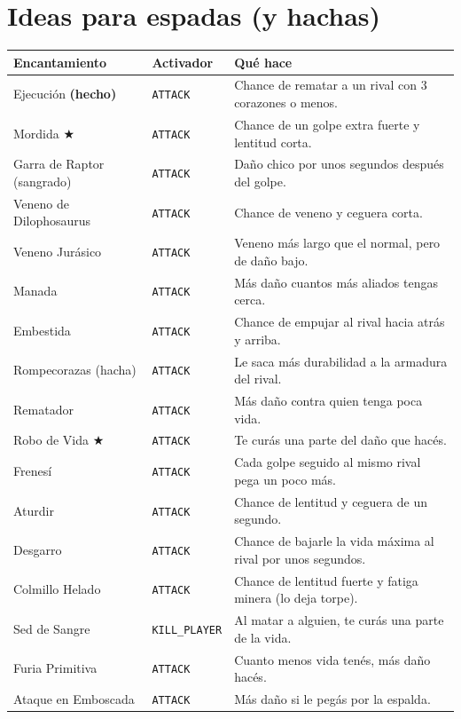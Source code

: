 \documentclass[11pt,a4paper]{article}
\newcommand{\tr}[1]{\texttt{\small #1}}           %
\newcommand{\rec}{\textcolor{rosa}{\textbf{$\bigstar$}}} %
\newcommand{\hecho}{\textcolor{azul}{\textbf{(hecho)}}}
\begin{document}
\section{Ideas para espadas (y hachas)}

\begin{longtable}{L{3.5cm} L{3.4cm} L{8.6cm}}
\toprule
\textbf{Encantamiento} & \textbf{Activador} & \textbf{Qué hace}\\
\midrule
\endhead
Ejecución \hecho & \tr{ATTACK} & Chance de rematar a un rival con 3 corazones o menos.\\
Mordida \rec & \tr{ATTACK} & Chance de un golpe extra fuerte y lentitud corta.\\
Garra de Raptor (sangrado) & \tr{ATTACK} & Daño chico por unos segundos después del golpe.\\
Veneno de Dilophosaurus & \tr{ATTACK} & Chance de veneno y ceguera corta.\\
Veneno Jurásico & \tr{ATTACK} & Veneno más largo que el normal, pero de daño bajo.\\
Manada & \tr{ATTACK} & Más daño cuantos más aliados tengas cerca.\\
Embestida & \tr{ATTACK} & Chance de empujar al rival hacia atrás y arriba.\\
Rompecorazas (hacha) & \tr{ATTACK} & Le saca más durabilidad a la armadura del rival.\\
Rematador & \tr{ATTACK} & Más daño contra quien tenga poca vida.\\
Robo de Vida \rec & \tr{ATTACK} & Te curás una parte del daño que hacés.\\
Frenesí & \tr{ATTACK} & Cada golpe seguido al mismo rival pega un poco más.\\
Aturdir & \tr{ATTACK} & Chance de lentitud y ceguera de un segundo.\\
Desgarro & \tr{ATTACK} & Chance de bajarle la vida máxima al rival por unos segundos.\\
Colmillo Helado & \tr{ATTACK} & Chance de lentitud fuerte y fatiga minera (lo deja torpe).\\
Sed de Sangre & \tr{KILL\_PLAYER} & Al matar a alguien, te curás una parte de la vida.\\
Furia Primitiva & \tr{ATTACK} & Cuanto menos vida tenés, más daño hacés.\\
Ataque en Emboscada & \tr{ATTACK} & Más daño si le pegás por la espalda.\\

\end{longtable}
\end{document}
